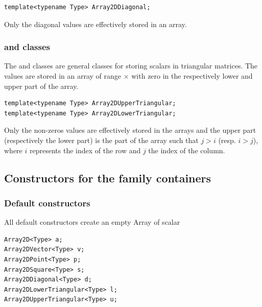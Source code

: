 \documentclass[a4paper,10pt]{article}
\begin{document}
\begin{lstlisting}[style=customcpp]
template<typename Type> Array2DDiagonal;
\end{lstlisting}

\begin{note}
Only the diagonal values are effectively stored in an  array.
\end{note}

\subsubsection{ and   classes}

The   and   classes are
general classes for storing scalars in triangular matrices.
The values are stored in an array of range
\code{[beginRows:endRows)}$\times$\code{[beginCols:endCols)} with zero in the
respectively lower and upper part of the array.


\begin{lstlisting}[style=customcpp]
template<typename Type> Array2DUpperTriangular;
template<typename Type> Array2DLowerTriangular;
\end{lstlisting}

\begin{note}
Only the non-zeros values are effectively stored in the arrays and
the upper part (respectively the lower part) is the part of the array such
that $j>i$ (resp. $i>j$), where $i$ represents the index of the row and $j$ the index
of the column.
\end{note}

\subsection{Constructors for the  family containers}

\subsubsection{Default constructors}
All default constructors create an empty Array of scalar 
\begin{lstlisting}[style=customcpp]
Array2D<Type> a;
Array2DVector<Type> v;
Array2DPoint<Type> p;
Array2DSquare<Type> s;
Array2DDiagonal<Type> d;
Array2DLowerTriangular<Type> l;
Array2DUpperTriangular<Type> u;
\end{lstlisting}
\end{document}

